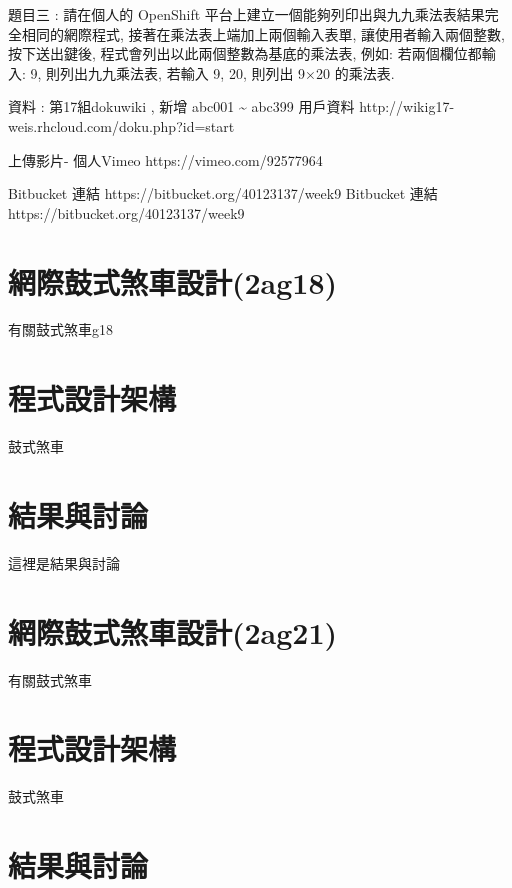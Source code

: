 \documentclass[]{article}
\begin{document}
題目三 : 請在個人的 OpenShift
平台上建立一個能夠列印出與九九乘法表結果完全相同的網際程式,
接著在乘法表上端加上兩個輸入表單, 讓使用者輸入兩個整數, 按下送出鍵後,
程式會列出以此兩個整數為基底的乘法表, 例如: 若兩個欄位都輸入: 9,
則列出九九乘法表, 若輸入 9, 20, 則列出 9×20 的乘法表.

資料 : 第17組dokuwiki , 新增 abc001 \textasciitilde{} abc399 用戶資料
http://wikig17-weis.rhcloud.com/doku.php?id=start

上傳影片- 個人Vimeo https://vimeo.com/92577964

Bitbucket 連結 https://bitbucket.org/40123137/week9 Bitbucket 連結
https://bitbucket.org/40123137/week9

\section{網際鼓式煞車設計(2ag18)}\label{ux7db2ux969bux9f13ux5f0fux715eux8ecaux8a2dux8a082ag18}

有關鼓式煞車g18

\section{程式設計架構}\label{ux7a0bux5f0fux8a2dux8a08ux67b6ux69cb-11}

鼓式煞車

\section{結果與討論}\label{ux7d50ux679cux8207ux8a0eux8ad6-11}

這裡是結果與討論

\section{網際鼓式煞車設計(2ag21)}\label{ux7db2ux969bux9f13ux5f0fux715eux8ecaux8a2dux8a082ag21}

有關鼓式煞車

\section{程式設計架構}\label{ux7a0bux5f0fux8a2dux8a08ux67b6ux69cb-12}

鼓式煞車

\section{結果與討論}\label{ux7d50ux679cux8207ux8a0eux8ad6-12}
\end{document}
